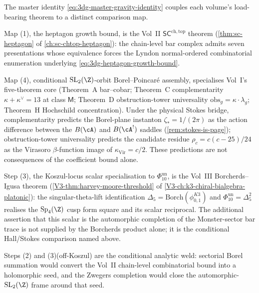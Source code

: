 \begin{remark}%
\label{rem:3dg-master-three-volumes}%
%
%
%
%
The master identity \eqref{eq:3dg-master-gravity-identity} couples
each volume's load-bearing theorem to a distinct comparison map.

Map (1), the heptagon growth bound, is the Vol~II
$\mathsf{SC}^{\mathrm{ch,top}}$ theorem
\textup{(\autoref{thm:sc-heptagon}}
of \autoref{ch:sc-chtop-heptagon}): the chain-level bar complex
admits seven presentations whose equivalence forces the Lyndon
normal-ordered combinatorial enumeration underlying
\eqref{eq:3dg-heptagon-growth-bound}.

Map (4), conditional \(\mathrm{SL}_{2}(\Z)\)-orbit Borel--Poincar\'e
assembly, specialises Vol~I's five-theorem core
(Theorem~A bar--cobar; Theorem~C complementarity
$\kappa + \kappa^{\vee} = 13$ at class $\mathsf M$;
Theorem~D obstruction-tower universality $\mathrm{obs}_{g} =
\kappa\cdot\lambda_{g}$; Theorem~H Hochschild concentration).
Under the physical Stokes bridge, complementarity predicts the
Borel-plane instanton \(\zeta_{\ast} = 1/(2\pi)\) as the action
difference between the \(B(\cA)\) and \(B(\cA^{!})\) saddles
(\autoref{rem:stokes-is-page}); obstruction-tower universality
predicts the candidate residue \(\rho_{c} = c(c-25)/24\) as the
Virasoro \(\beta\)-function image of
\(\kappa_{\mathrm{Vir}} = c/2\). These predictions are not consequences
of the coefficient bound alone.

Step (3), the Koszul-locus scalar specialisation to \(\Phi_{10}^{\mathrm{un}}\), is
the Vol~III Borcherds--Igusa theorem
(\autoref{V3-thm:harvey-moore-threshold} of
\autoref{V3-ch:k3-chiral-bialgebra-platonic}): the
singular-theta-lift identification
\(\Delta_5=\mathrm{Borch}(\phi_{0,1}^{K3})\) and
\(\Phi_{10}^{\mathrm{un}}=\Delta_5^2\) realises the
\(\mathrm{Sp}_{4}(\Z)\) cusp form square and its scalar reciprocal. The
additional assertion that this scalar is the automorphic completion
of the Monster-sector bar trace is not supplied by the Borcherds
product alone; it is the conditional Hall/Stokes comparison named
above.

Steps (2) and (3)(off-Koszul) are the conditional analytic weld:
sectorial Borel summation would convert the Vol~II chain-level
combinatorial bound into a holomorphic seed, and the Zwegers
completion would close the automorphic-\(\mathrm{SL}_{2}(\Z)\) frame
around that seed.
\end{remark}

